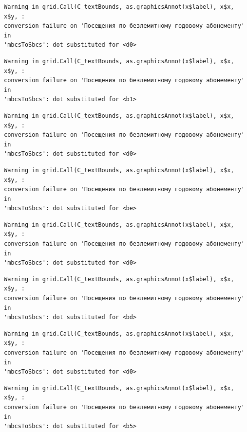\documentclass[
  letterpaper,
  DIV=11,
  numbers=noendperiod]{scrartcl}
\begin{document}
\begin{verbatim}
Warning in grid.Call(C_textBounds, as.graphicsAnnot(x$label), x$x, x$y, :
conversion failure on 'Посещения по безлемитному годовому абонементу' in
'mbcsToSbcs': dot substituted for <d0>
\end{verbatim}

\begin{verbatim}
Warning in grid.Call(C_textBounds, as.graphicsAnnot(x$label), x$x, x$y, :
conversion failure on 'Посещения по безлемитному годовому абонементу' in
'mbcsToSbcs': dot substituted for <b1>
\end{verbatim}

\begin{verbatim}
Warning in grid.Call(C_textBounds, as.graphicsAnnot(x$label), x$x, x$y, :
conversion failure on 'Посещения по безлемитному годовому абонементу' in
'mbcsToSbcs': dot substituted for <d0>
\end{verbatim}

\begin{verbatim}
Warning in grid.Call(C_textBounds, as.graphicsAnnot(x$label), x$x, x$y, :
conversion failure on 'Посещения по безлемитному годовому абонементу' in
'mbcsToSbcs': dot substituted for <be>
\end{verbatim}

\begin{verbatim}
Warning in grid.Call(C_textBounds, as.graphicsAnnot(x$label), x$x, x$y, :
conversion failure on 'Посещения по безлемитному годовому абонементу' in
'mbcsToSbcs': dot substituted for <d0>
\end{verbatim}

\begin{verbatim}
Warning in grid.Call(C_textBounds, as.graphicsAnnot(x$label), x$x, x$y, :
conversion failure on 'Посещения по безлемитному годовому абонементу' in
'mbcsToSbcs': dot substituted for <bd>
\end{verbatim}

\begin{verbatim}
Warning in grid.Call(C_textBounds, as.graphicsAnnot(x$label), x$x, x$y, :
conversion failure on 'Посещения по безлемитному годовому абонементу' in
'mbcsToSbcs': dot substituted for <d0>
\end{verbatim}

\begin{verbatim}
Warning in grid.Call(C_textBounds, as.graphicsAnnot(x$label), x$x, x$y, :
conversion failure on 'Посещения по безлемитному годовому абонементу' in
'mbcsToSbcs': dot substituted for <b5>
\end{verbatim}
\end{document}
